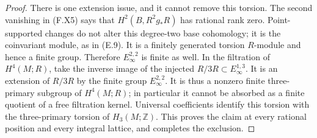\begin{proof}
There is one extension issue, and it cannot remove
this torsion.  The second vanishing in (F.X5) says
that $H^2(B,R^2g_*R)$ has rational rank zero.
Point-supported changes do not alter this degree-two
base cohomology; it is the coinvariant module, as
in (E.9).  It is a finitely generated torsion $R$-module
and hence a finite group.  Therefore
$E_\infty^{2,2}$ is finite as well.  In the filtration
of $H^4(M;R)$, take the inverse image of the injected
$R/3R\subset E_\infty^{1,3}$.  It is an extension
of $R/3R$ by the finite group $E_\infty^{2,2}$.
It is thus a nonzero finite three-primary subgroup
of $H^4(M;R)$; in particular it cannot be absorbed
as a finite quotient of a free filtration kernel.
Universal coefficients identify this torsion with
the three-primary torsion of $H_3(M;\mathbb Z)$.
This proves the claim at every rational position and
every integral lattice, and completes the exclusion.
\end{proof}
